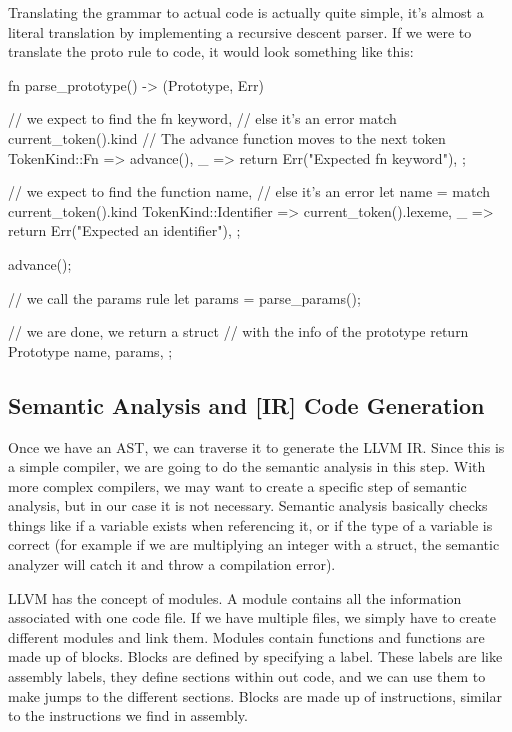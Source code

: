 ﻿\documentclass[10pt,a4paper,twocolumn,twoside]{article}
\begin{document}
\vspace{10px}

Translating the grammar to actual code is actually quite simple, it's almost a
literal translation by implementing a recursive descent parser. If we were to
translate the proto rule to code, it would look something like this:
\vfill

\begin{code}
fn parse_prototype() -> (Prototype, Err) {
    // we expect to find the fn keyword,
    // else it's an error
    match current_token().kind {
        // The advance function moves to the next token
        TokenKind::Fn => advance(),
        _ => return Err("Expected fn keyword"),
    };

    // we expect to find the function name,
    // else it's an error
    let name = match current_token().kind {
        TokenKind::Identifier => current_token().lexeme,
        _ => return Err("Expected an identifier"),
    };

    advance();

    // we call the params rule
    let params = parse_params();

    // we are done, we return a struct 
    // with the info of the prototype
    return Prototype { 
        name,
        params,
    };
}
\end{code}

\subsection{Semantic Analysis and [IR] Code Generation}
Once we have an AST, we can traverse it to generate the LLVM IR. Since this is a
simple compiler, we are going to do the semantic analysis in this step. With 
more complex compilers, we may want to create a specific step of semantic 
analysis, but in our case it is not necessary. Semantic analysis basically 
checks things like if a variable exists when referencing it, or if the type of a
variable is correct (for example if we are multiplying an integer with a struct,
the semantic analyzer will catch it and throw a compilation error).

LLVM has the concept of modules. A module contains all the information
associated with one code file. If we have multiple files, we simply have to
create different modules and link them. Modules contain functions and functions
are made up of blocks. Blocks are defined by specifying a label. These labels
are like assembly labels, they define sections within out code, and we can use
them to make jumps to the different sections. Blocks are made up of
instructions, similar to the instructions we find in assembly.
\end{document}
